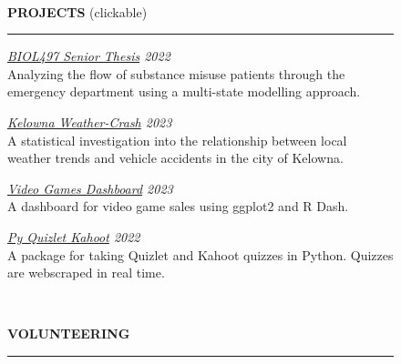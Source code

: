 \documentclass[11pt, a4paper]{article}
\begin{document}
\begin{figure}[H]
\begin{minipage}[t]{0.7\textwidth}

\par

\phantom{3pt} \\

\par

\textbf{\large{PROJECTS}} \hfill (clickable)
\par\noindent\rule{\textwidth}{1.0pt}
\par
\vspace{0.5pc}

\textit{\href{https://www.jonahedmundson.xyz/edmundson\_finalsubmission.pdf}{BIOL497 Senior Thesis} \hfill 2022} \\ 
Analyzing the flow of substance misuse patients through the emergency department using a multi-state modelling approach.

\vspace{1.5pc}

\textit{\href{https://github.com/jonahedmundson/kelowna\_weathercrash}{Kelowna Weather-Crash} \hfill 2023} \\
A statistical investigation into the relationship between local weather trends and vehicle accidents in the city of Kelowna. 

\vspace{1.5pc}

\textit{\href{https://github.com/jonahedmundson/VGsalesDashboard\_R}{Video Games Dashboard} \hfill 2023} \\
A dashboard for video game sales using ggplot2 and R Dash. 

\vspace{1.5pc}

\textit{\href{https://github.com/jonahedmundson/py\_quizlet\_cram}{Py Quizlet Kahoot} \hfill 2022} \\
A package for taking Quizlet and Kahoot quizzes in Python. Quizzes are webscraped in real time.




\par

\phantom{3pt} \\

\par

\textbf{\large{VOLUNTEERING}}
\par\noindent\rule{\textwidth}{1.0pt}
\par
\vspace{0.5pc}


\end{minipage}
\end{figure}
\end{document}
